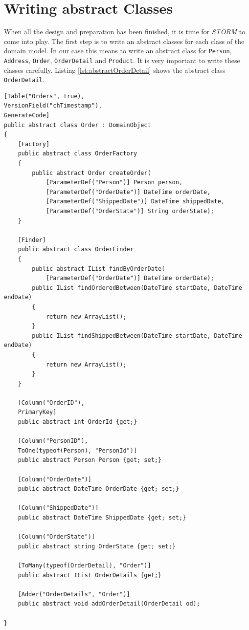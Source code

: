 	\section{Writing abstract Classes}
		When all the design and preparation has been finished, it is time for \textit{STORM} to
		come into play. The first step is to write an abstract classes for each class of the
		domain model. In our case this means to write an abstract class for \verb~Person~,
		\verb~Address~, \verb~Order~, \verb~OrderDetail~ and \verb~Product~. It is very
		important to write these classes carefully. Listing \ref{lst:abstractOrderDetail}
		shows the abstract class \verb~OrderDetail~. 
		
		\begin{lstlisting}[language={[Sharp]C},caption=Defining OrderDetail as abstract class.,
		label=lst:abstractOrderDetail]
[Table("Orders", true),
VersionField("chTimestamp"),
GenerateCode]
public abstract class Order : DomainObject
{
	[Factory]
	public abstract class OrderFactory
	{
		public abstract Order createOrder(
			[ParameterDef("Person")] Person person,
			[ParameterDef("OrderDate")] DateTime orderDate,
			[ParameterDef("ShippedDate")] DateTime shippedDate,
			[ParameterDef("OrderState")] String orderState);
	}

	[Finder]
	public abstract class OrderFinder
	{
		public abstract IList findByOrderDate(
			[ParameterDef("OrderDate")] DateTime orderDate);
		public IList findOrderedBetween(DateTime startDate, DateTime endDate)
		{
			return new ArrayList();
		}
		public IList findShippedBetween(DateTime startDate, DateTime endDate)
		{
			return new ArrayList();
		}
	}

	[Column("OrderID"),
	PrimaryKey]
	public abstract int OrderId {get;}

	[Column("PersonID"),
	ToOne(typeof(Person), "PersonId")]
	public abstract Person Person {get; set;}

	[Column("OrderDate")]
	public abstract DateTime OrderDate {get; set;}
	
	[Column("ShippedDate")]
	public abstract DateTime ShippedDate {get; set;}
	
	[Column("OrderState")]
	public abstract string OrderState {get; set;}

	[ToMany(typeof(OrderDetail), "Order")]
	public abstract IList OrderDetails {get;}
	
	[Adder("OrderDetails", "Order")]
	public abstract void addOrderDetail(OrderDetail od);

}
		\end{lstlisting}
		
